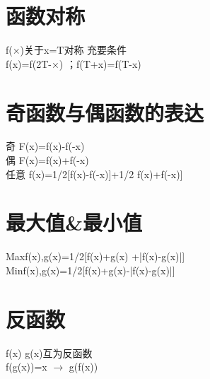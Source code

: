 \documentclass[UTF8]{ctexart}
\begin{document}
\section{函数对称}
f(×)关于x=T对称  充要条件 \\
f(x)=f(2T-×)  ；f(T+x)=f(T-x)

\section{奇函数与偶函数的表达}
奇 F(x)=f(x)-f(-x) \\
偶 F(x)=f(x)+f(-x) \\
任意 f(x)=1/2[f(x)-f(-x)]+1/2 f(x)+f(-x)]

\section{最大值\&最小值}
Max{f(x),g(x)}=1/2[f(x)+g(x) +|f(x)-g(x)|] \\
Min{f(x),g(x)}=1/2[f(x)+g(x)-|f(x)-g(x)|]

\section{反函数}
f(x)  g(x)互为反函数 \\
f(g(x))=x $\rightarrow$  g(f(x))
\end{document}
